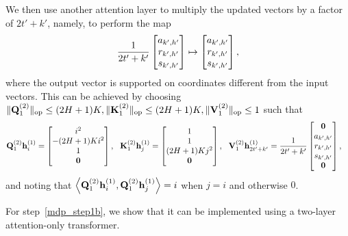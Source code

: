 We then use another  attention layer to  multiply the updated vectors by a factor of $2t'+k'$, namely, to perform the map
$$\frac{1}{2t'+k'}\begin{bmatrix}
        {a}_{k',h'} \\{r}_{k',h'}\\{s}_{k',h'}
    \end{bmatrix}\mapsto\begin{bmatrix}
        {a}_{k',h'} \\{r}_{k',h'}\\{s}_{k',h'}
    \end{bmatrix},$$ where the output vector is supported on coordinates different from the input vectors. This can be achieved by choosing $\|{{\mathbf Q}_1^{(2)}}\|_{\mathrm{op}}\leq (2{H}+1){K}, \|{{\mathbf K}_1^{(2)}}\|_{\mathrm{op}}\leq (2{H}+1){K}, \|{{\mathbf V}_1^{(2)}}\|_{\mathrm{op}}\leq1$
such that \begin{align}
    &
{\mathbf Q}^{(2)}_{1}{\mathbf h}^{(1)}_{i}=\begin{bmatrix}
         i^2\\-(2{H}+1){K} i^2\\  1\\ {\mathbf 0}
    \end{bmatrix},~~ {\mathbf K}^{(2)}_{1}{\mathbf h}^{(1)}_{j}=\begin{bmatrix}
        1\\1\\ (2{H}+1){K} j^2\\{\mathbf 0}
    \end{bmatrix},~~ 
{\mathbf V}^{(2)}_{1}{\mathbf h}^{(1)}_{2t'+k'}=\frac{1}{2t'+k'}\begin{bmatrix}
        {\mathbf 0}\\ 
        {a}_{k',h'} \\{r}_{k',h'}\\{s}_{k',h'}
    \\ {\mathbf 0}
    \end{bmatrix},\label{eq:tf_constrcut_ucbvi_multi}
\end{align}
and noting that $\left\langle{\mathbf Q}^{(2)}_1{\mathbf h}_i^{(1)},{\mathbf Q}^{(2)}_1{\mathbf h}_j^{(1)}\right\rangle=i$ when $j=i$ and otherwise $0$.

For step~\ref{mdp_step1b},  we show that it can be implemented using a two-layer attention-only transformer. 

